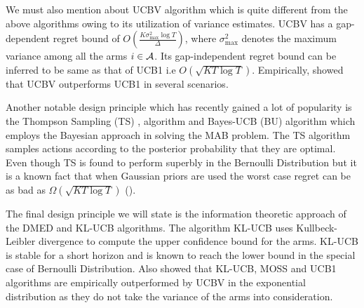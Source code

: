 	We must also mention about UCBV \citep{audibert2009exploration} algorithm which is quite different  from the above algorithms owing to its utilization of variance estimates. UCBV has a gap-dependent regret bound of $O\left(\frac{K\sigma_{\max}^{2}\log T}{\Delta}\right)$, where $\sigma_{\max}^{2}$ denotes the maximum variance among all the arms $i\in \mathcal{A}$. Its gap-independent regret bound can be inferred to be same as that of UCB1 i.e $O \left(\sqrt{KT\log T}\right)$. Empirically, \citet{audibert2009exploration} showed that UCBV outperforms UCB1 in several scenarios. 
	
	Another notable design principle which has recently gained a lot of popularity is the Thompson Sampling (TS) \citep{thompson1933likelihood}, \citep{agrawal2011analysis} algorithm and Bayes-UCB (BU) algorithm \citep{kaufmann2012bayesian} which employs the Bayesian approach in solving the MAB problem. The TS algorithm samples actions according to the posterior probability that they are optimal. Even though TS is found to perform superbly in the Bernoulli Distribution but it is a known fact that when Gaussian priors are used the worst case regret can be as bad as $\Omega \left( \sqrt{KT\log T}\right)$ (\citep{lattimore2015optimally}).
	
	The final design principle we will state is the information theoretic approach of the DMED \citep{honda2010asymptotically} and KL-UCB \citep{garivier2011kl} algorithms. The algorithm KL-UCB uses Kullbeck-Leibler divergence to compute the upper confidence bound for the arms. KL-UCB is stable for a short horizon and is known to reach the \citet{lai1985asymptotically} lower bound in the special case of Bernoulli Distribution. Also \citep{garivier2011kl} showed that KL-UCB, MOSS and UCB1 algorithms are  empirically outperformed by UCBV in the exponential distribution as they do not take the variance of the arms into consideration. 